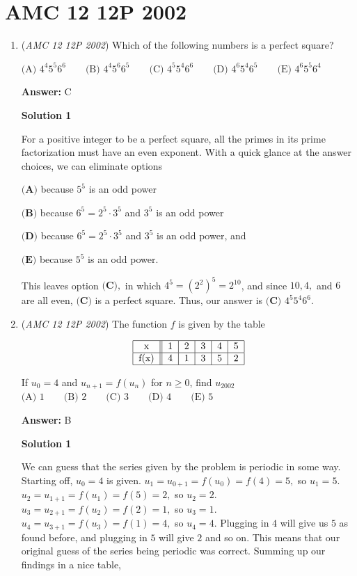 \section{AMC 12 12P 2002}
        \begin{enumerate}
        	\item (\textit{AMC 12 12P 2002}) Which of the following numbers is a perfect square?


 $\text{(A) }4^4 5^5 6^6 \qquad \text{(B) }4^4 5^6 6^5 \qquad \text{(C) }4^5 5^4 6^6 \qquad \text{(D) }4^6 5^4 6^5 \qquad \text{(E) }4^6 5^5 6^4$

 \textbf{Answer: }C



\textbf{Solution 1}

For a positive integer to be a perfect square, all the primes in its prime factorization must have an even exponent. With a quick glance at the answer choices, we can eliminate options

 $\textbf{(A)}$ because $5^5$ is an odd power

 $\textbf{(B)}$ because $6^5 = 2^5 \cdot 3^5$ and $3^5$ is an odd power

 $\textbf{(D)}$ because $6^5 = 2^5 \cdot 3^5$ and $3^5$ is an odd power, and

 $\textbf{(E)}$ because $5^5$ is an odd power.

 This leaves option $\textbf{(C)},$ in which $4^5=(2^{2})^{5}=2^{10}$, and since $10, 4,$ and $6$ are all even, $\textbf{(C)}$ is a perfect square. Thus, our answer is $\boxed{\textbf{(C) } 4^5 5^4 6^6}.$



	\item (\textit{AMC 12 12P 2002}) The function $f$ is given by the table


 
 \[\begin{tabular}{|c||c|c|c|c|c|}  \hline   x & 1 & 2 & 3 & 4 & 5 \\   \hline  f(x) & 4 & 1 & 3 & 5 & 2 \\  \hline \end{tabular}\]


 If $u_0=4$ and $u_{n+1} = f(u_n)$ for $n \ge 0$, find $u_{2002}$
$\text{(A) }1 \qquad \text{(B) }2 \qquad \text{(C) }3 \qquad \text{(D) }4 \qquad \text{(E) }5$

 \textbf{Answer: }B



\textbf{Solution 1}

We can guess that the series given by the problem is periodic in some way. Starting off, $u_0=4$ is given. $u_1=u_{0+1}=f(u_0)=f(4)=5,$ so $u_1=5.$ $u_2=u_{1+1}=f(u_1)=f(5)=2,$ so $u_2=2.$ $u_3=u_{2+1}=f(u_2)=f(2)=1,$ so $u_3=1.$ $u_4=u_{3+1}=f(u_3)=f(1)=4,$ so $u_4=4.$ Plugging in $4$ will give us $5$ as found before, and plugging in $5$ will give $2$ and so on. This means that our original guess of the series being periodic was correct. Summing up our findings in a nice table,


\end{enumerate}
